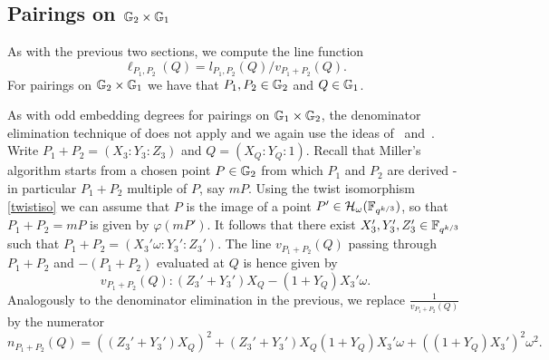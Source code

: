 \subsection{Pairings on $\mathbb{G}_{2} \times \mathbb{G}_{1}$}

As with the previous two sections, we compute the line function 
$$\ell_{P_1,P_2}(Q) = l_{P_1,P_2}(Q)/v_{P_1 + P_2}(Q).$$
For pairings on $\mathbb{G}_{2} \times \mathbb{G}_{1}$ we have that $P_1, P_2 \in \mathbb{G}_{2}$ and $Q \in \mathbb{G}_{1}$.

As with odd embedding degrees for pairings on $\mathbb{G}_{1} \times \mathbb{G}_{2}$, 
the denominator elimination technique of \cite{2010/Gu} does not apply
 and we again use the ideas of~\cite{2008/lin} and~\cite{2009/deg15}.
Write $P_1 + P_2 = (X_3:Y_3:Z_3)$ and $Q = (X_Q:Y_Q:1)$. 
Recall that Miller's algorithm starts from a chosen point $P \in \mathbb{G}_{2}$
from which $P_1$ and $P_2$ are derived - in particular $P_1 + P_2$
multiple of $P$, say $mP$.
Using the twist isomorphism \eqref{twistiso} we can assume that
$P$ is the image of a point $P' \in \mathcal{H}_{\omega}(\mathbb{F}_{q^{k/3}})$,
so that $P_1 + P_2 = mP$ is given by $\varphi(mP')$.
It follows that there exist $X_3', Y_3',Z_3' \in \mathbb{F}_{q^{k/3}}$ such that
$P_1 + P_2 = (X_3'\omega : Y_3':Z_3')$. 
The line $v_{P_1+P_2}(Q)$ passing through $P_1+P_2$ and $-(P_1 + P_2)$ 
evaluated at $Q$
is hence given by
\[v_{P_1+P_2}(Q): 
(Z_3' + Y_3')X_Q - (1+Y_Q)X_3'\omega.\]
Analogously to the denominator elimination in the previous, we
replace $\frac{1}{v_{P_1+P_2}(Q)}$ by the numerator 
$$n_{P_1+P_2}(Q) = ((Z_3' + Y_3')X_Q)^2 
+ (Z_3' + Y_3')X_Q(1+Y_Q)X_3'\omega 
+ ((1+Y_Q)X_3')^2\omega^2.$$


